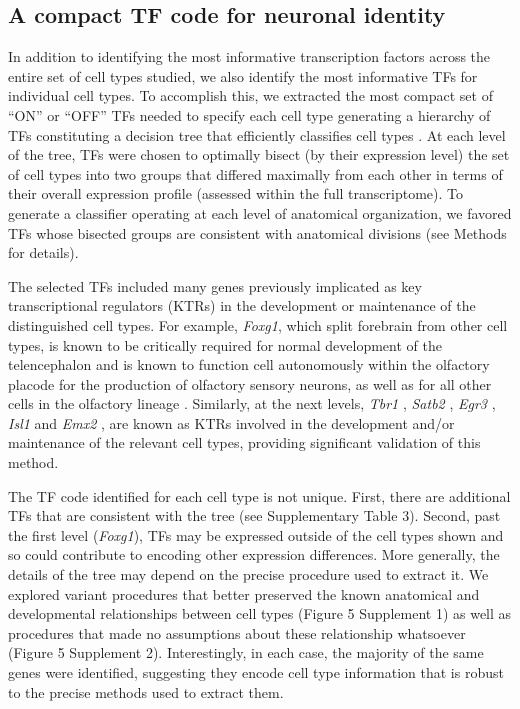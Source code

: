 \subsection{A compact TF code for neuronal identity}
In addition to identifying the most informative transcription factors across the entire set of cell types studied, we also identify the most informative TFs for individual cell types. To accomplish this, we extracted the most compact set of “ON” or “OFF” TFs needed to specify each cell type generating a hierarchy of TFs constituting a decision tree that efficiently classifies cell types \citep{Gabitto_2016}. At each level of the tree, TFs were chosen to optimally bisect (by their expression level) the set of cell types into two groups that differed maximally from each other in terms of their overall expression profile (assessed within the full transcriptome). To generate a classifier operating at each level of anatomical organization, we favored TFs whose bisected groups are consistent with anatomical divisions (see Methods for details).

The selected TFs included many genes previously implicated as key transcriptional regulators (KTRs) in the development or maintenance of the distinguished cell types. For example, \textit{Foxg1}, which split forebrain from other cell types, is known to be critically required for normal development of the telencephalon \citep{Xuan_1995, Danesin_2012} and is known to function cell autonomously within the olfactory placode for the production of olfactory sensory neurons, as well as for all other cells in the olfactory lineage \citep{Duggan_2008}. 
Similarly, at the next levels, \textit{Tbr1} \citep{Bedogni_2010}, \textit{Satb2} \cite{Leone_2014}, \textit{Egr3} \citep{Chandra_2015}, \textit{Isl1} \citep{Lu_2013} and \textit{Emx2} \citep{Zhang_2016}, are known as KTRs involved in the development and/or maintenance of the relevant cell types, providing significant validation of this method.

The TF code identified for each cell type is not unique. First, there are additional TFs that are consistent with the tree (see Supplementary Table 3). Second, past the first level (\textit{Foxg1}), TFs may be expressed outside of the cell types shown and so could contribute to encoding other expression differences. More generally, the details of the tree may depend on the precise procedure used to extract it. We explored variant procedures that better preserved the known anatomical and developmental relationships between cell types (Figure 5 Supplement 1) as well as procedures that made no assumptions about these relationship whatsoever (Figure 5 Supplement 2). Interestingly, in each case, the majority of the same genes were identified, suggesting they encode cell type information that is robust to the precise methods used to extract them.

